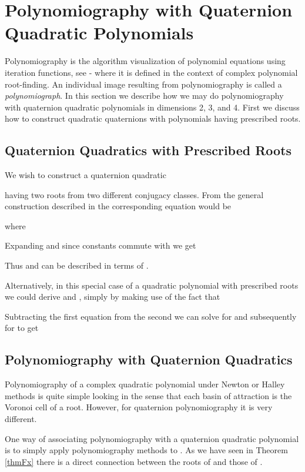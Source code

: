 \documentclass{article}
\theoremstyle{definition}
\begin{document}
\section{Polynomiography with Quaternion Quadratic Polynomials}

Polynomiography is the algorithm visualization of polynomial
equations using iteration functions, see \cite{kalbook}-\cite{kal2005c} where it is defined in the context of complex
polynomial root-finding. An individual image resulting from
polynomiography is called a {\it polynomiograph}. In this section we
describe how we may do polynomiography with quaternion quadratic
polynomials in dimensions 2, 3, and 4. First we discuss how to
construct quadratic quaternions with polynomials having prescribed roots.

\subsection{Quaternion Quadratics with Prescribed Roots}

We wish to construct a quaternion quadratic

having two roots  from two different conjugacy
classes. From the general construction described in \cite{kalQ}  the corresponding equation would be

where

Expanding  and since constants commute with  we get

Thus  and  can be described in terms of .

Alternatively, in this special case of a quadratic polynomial with prescribed roots we could derive  and , simply by making use of the fact that

Subtracting the first equation from the second we can solve for  and subsequently for  to get


\subsection{Polynomiography with Quaternion Quadratics}
Polynomiography of a complex quadratic polynomial under Newton or Halley methods
is quite simple looking in the sense that each basin of attraction is the Voronoi cell of a root. However, for quaternion polynomiography it is very different.

One way of associating polynomiography  with a quaternion quadratic
polynomial  is to simply apply polynomiography methods to
. As we have seen in Theorem \ref{thmFx} there is a direct connection between the roots of  and those of .
\end{document}
